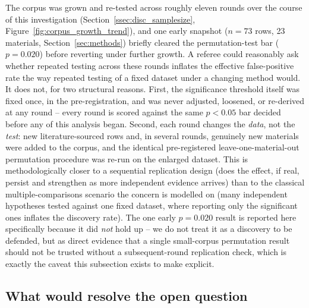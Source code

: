 \documentclass[aip,amsmath,amssymb,reprint]{revtex4-1}
\begin{document}
The corpus was grown and re-tested across roughly eleven rounds over the course of this
investigation (Section~\ref{ssec:disc_samplesize}, Figure~\ref{fig:corpus_growth_trend}), and one
early snapshot ($n=73$ rows, 23 materials, Section~\ref{sec:methods}) briefly cleared the
permutation-test bar ($p=0.020$) before reverting under further growth. A referee could
reasonably ask whether repeated testing across these rounds inflates the effective false-positive
rate the way repeated testing of a fixed dataset under a changing method would. It does not, for
two structural reasons. First, the significance threshold itself was fixed once, in the
pre-registration, and was never adjusted, loosened, or re-derived at any round -- every round is
scored against the same $p<0.05$ bar decided before any of this analysis began. Second, each round
changes the \emph{data}, not the \emph{test}: new literature-sourced rows and, in several rounds,
genuinely new materials were added to the corpus, and the identical pre-registered
leave-one-material-out permutation procedure was re-run on the enlarged dataset. This is
methodologically closer to a sequential replication design (does the effect, if real, persist and
strengthen as more independent evidence arrives) than to the classical multiple-comparisons
scenario the concern is modelled on (many independent hypotheses tested against one fixed dataset,
where reporting only the significant ones inflates the discovery rate). The one early $p=0.020$
result is reported here specifically because it did \emph{not} hold up -- we do not treat it as a
discovery to be defended, but as direct evidence that a single small-corpus permutation result
should not be trusted without a subsequent-round replication check, which is exactly the caveat
this subsection exists to make explicit.

\subsection{What would resolve the open question}
\label{ssec:disc_resolve}
\end{document}
